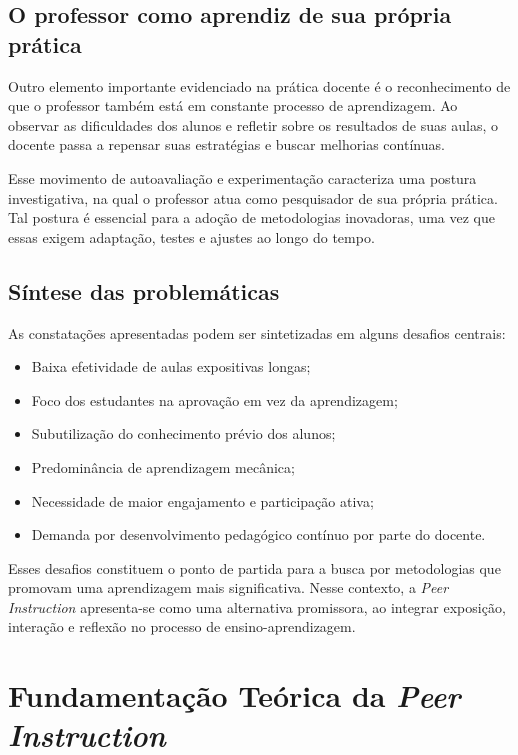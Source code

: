 \subsection{O professor como aprendiz de sua própria prática}

Outro elemento importante evidenciado na prática docente é o reconhecimento de que o professor também está em constante processo de aprendizagem. Ao observar as dificuldades dos alunos e refletir sobre os resultados de suas aulas, o docente passa a repensar suas estratégias e buscar melhorias contínuas.

Esse movimento de autoavaliação e experimentação caracteriza uma postura investigativa, na qual o professor atua como pesquisador de sua própria prática. Tal postura é essencial para a adoção de metodologias inovadoras, uma vez que essas exigem adaptação, testes e ajustes ao longo do tempo.

\subsection{Síntese das problemáticas}

As constatações apresentadas podem ser sintetizadas em alguns desafios centrais:

\begin{itemize}
    \item Baixa efetividade de aulas expositivas longas;
    \item Foco dos estudantes na aprovação em vez da aprendizagem;
    \item Subutilização do conhecimento prévio dos alunos;
    \item Predominância de aprendizagem mecânica;
    \item Necessidade de maior engajamento e participação ativa;
    \item Demanda por desenvolvimento pedagógico contínuo por parte do docente.
\end{itemize}

Esses desafios constituem o ponto de partida para a busca por metodologias que promovam uma aprendizagem mais significativa. Nesse contexto, a {\it Peer Instruction} apresenta-se como uma alternativa promissora, ao integrar exposição, interação e reflexão no processo de ensino-aprendizagem.

\section{Fundamentação Teórica da {\it Peer Instruction}}

